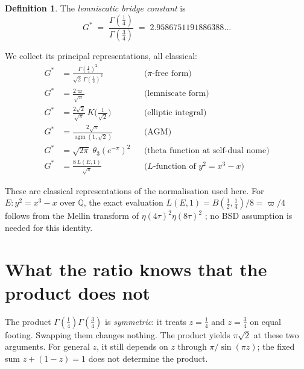 \documentclass[12pt,reqno]{amsart}
\theoremstyle{definition}
\newtheorem{definition}[theorem]{Definition}
\theoremstyle{remark}
\newcommand{\QQ}{\mathbb{Q}}
\newcommand{\Gstar}{G^{\!*}}
\newcommand{\varpiup}{\varpi}
\newcommand{\agm}{\operatorname{agm}}
\begin{document}
\begin{definition}\label{def:Gstar}
The \emph{lemniscatic bridge constant} is
\begin{equation}\label{eq:Gstar}
  {\Gstar} \;=\; \frac{\Gamma(\tfrac14)}{\Gamma(\tfrac34)}
  \;=\; 2.9586751191886388\ldots
\end{equation}
\end{definition}

We collect its principal representations, all classical:
\begin{align}
  {\Gstar} &= \frac{\Gamma(\tfrac14)^{2}}{\sqrt{2}\,\Gamma(\tfrac12)^{2}}
    &&\text{($\pi$-free form)}\label{eq:pifree}\\[4pt]
  {\Gstar} &= \frac{2\varpiup}{\sqrt{\pi}}
    &&\text{(lemniscate form)}\label{eq:lem}\\[4pt]
  {\Gstar} &= \frac{2\sqrt{2}}{\sqrt{\pi}}\,
    K\!\bigl(\tfrac{1}{\sqrt{2}}\bigr)
    &&\text{(elliptic integral)}\label{eq:elliptic}\\[4pt]
  {\Gstar} &= \frac{2\sqrt{\pi}}{\agm(1,\sqrt{2})}
    &&\text{(AGM)}\label{eq:agm}\\[4pt]
  {\Gstar} &= \sqrt{2\pi}\;\theta_{3}(e^{-\pi})^{2}
    &&\text{(theta function at self-dual nome)}\label{eq:theta}\\[4pt]
  {\Gstar} &= \frac{8\,L(E,1)}{\sqrt{\pi}}
    &&\text{($L$-function of $y^{2}=x^{3}-x$)}\label{eq:Lfunction}
\end{align}

These are classical representations of the normalisation used here.
For $E\colon y^2=x^3-x$ over $\QQ$, the exact evaluation
$L(E,1)=B(\frac12,\frac14)/8=\varpiup/4$
follows from the Mellin transform of $\eta(4\tau)^2\eta(8\tau)^2$
\cite[Lemma~3.1]{LiLongTu}; no BSD assumption is needed for this identity.


\section{What the ratio knows that the product does not}

The product $\Gamma(\tfrac14)\Gamma(\tfrac34)$ is \emph{symmetric}: it
treats $z=\tfrac14$ and $z=\tfrac34$ on equal footing.  Swapping them
changes nothing. The product yields $\pi\sqrt2$ at these two arguments.
For general $z$, it still depends on $z$ through $\pi/\sin(\pi z)$;
the fixed sum $z+(1-z)=1$ does not determine the product.
\end{document}
